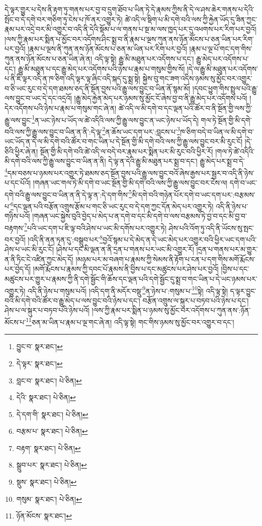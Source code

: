 དེ་ལྟར་གྱུར་པ་དེས་ནི་རྟག་ཏུ་གནས་པར་བྱ་བ་དྲུག་ཐོབ་པ་ཡིན་ཏེ་དེ་རྣམས་ཀྱིས་ནི་དེ་ལ་ཤས་ཆེར་གནས་པ་དེའི་སྤོང་བ་དེ་དགེ་བར་གཅིག་ཏུ་ངེས་པ་ཁོ་ནར་འགྱུར་ཏེ། ཚེ་འདི་ལ་སྡིག་པ་མི་དགེ་བའི་ལས་ཀྱི་རྐྱེན་ཡོད་དུ་ཟིན་ཀྱང་རྣམ་པར་འདྲེ་བར་མི་འགྱུར་བ་འདི་ནི་དེའི་སྡོམ་པ་ལ་གནས་པ་སྔ་མ་ལས་ཁྱད་པར་དུ་འཕགས་པར་རིག་པར་བྱའོ། །ལས་ཀྱི་རྣམ་པར་སྨིན་པ་མྱོང་བར་འདོགས་ཤིང་སྨྲ་བ་ནི་རྣམ་པ་ལྔས་ཀུན་ནས་ཉོན་མོངས་པ་ཅན་ཡིན་པར་རིག་པར་བྱའོ། །རྣམ་པ་ལྔས་ནི་ཀུན་ནས་ཉོན་མོངས་པ་ཅན་མ་ཡིན་པར་རིག་པར་བྱའོ། །རྣམ་པ་ལྔ་པོ་གང་དག་གིས་ཀུན་ནས་ཉོན་མོངས་པ་ཅན་ཡིན་ཞེ་ན། འདི་ལྟ་སྟེ། རྒྱུ་མི་མཐུན་པར་འདོགས་པ་དང་། རྒྱུ་མེད་པར་འདོགས་པ་དང་། རྒྱུ་མི་མཐུན་པ་དང་རྒྱུ་མེད་པར་འདོགས་པའི་ཉེས་པ་རྣམ་པ་གསུམ་གྱིས་སོ། །དེ་ལ་རྒྱུ་མི་མཐུན་པར་འདོགས་པ་ནི་ཇི་ལྟར་འདི་ན་ཁ་ཅིག་འདི་ལྟར་ལྟ་ཞིང་འདི་སྐད་དུ་སྨྲ་སྟེ། སྐྱེས་བུ་གང་ཟག་འདིས་ཉམས་སུ་མྱོང་བར་འགྱུར་བ་ཅི་ཡང་རུང་བ་དེ་དག་ཐམས་ཅད་ནི་སྔོན་བྱས་པའི་རྒྱུ་ལས་བྱུང་བ་ཡིན་ནོ་སྙམ་མོ། །དབང་ཕྱུག་གིས་སྤྲུལ་པའི་རྒྱུ་ལས་བྱུང་བ་ཡང་དེ་དང་འདྲའོ། །རྒྱུ་མེད་རྐྱེན་མེད་པར་ཉམས་སུ་མྱོང་ངོ་ཞེས་བྱ་བ་ནི་རྒྱུ་མེད་པར་འདོགས་པའོ། །དེར་འདོགས་པའི་ཉེས་པ་རྣམ་པ་གསུམ་གང་ཞེ་ན། ཚེ་འདི་ལ་མི་དགེ་བ་དང་ལྡན་པའི་ཚོར་བ་ནི་སྔོན་གྱི་ལས་ཀྱི་རྒྱུ་ལས་བྱུང་\footnote{བྱུང་བ་  སྣར་ཐང་། }ན་ཡང་ཉེས་པ་ཡོད་ལ་ཚེ་འདིའི་ལས་ཀྱི་རྒྱུ་ལས་བྱུང་ན་ཡང་ཉེས་པ་ཡོད་དེ། གལ་ཏེ་སྔོན་གྱི་མི་དགེ་བའི་ལས་ཀྱི་རྒྱུ་ལས་བྱུང་བ་ཡིན་ན་ནི་:དེ་ལྟ་\footnote{དེ་ལྟར་  སྣར་ཐང་། }ན་ཆོས་ཡང་དག་པར་:བླངས་པ་\footnote{བླང་བ་  སྣར་ཐང་།  པེ་ཅིན། }ཁ་ཅིག་བདེ་བ་ཡིན་ལ་མི་དགེ་བ་ཡང་ཡོད་ན་དེ་ལ་མི་དགེ་བའི་ཚོར་བ་གང་ཡིན་པ་དེ་སྔོན་གྱི་མི་དགེ་བའི་ལས་ཀྱི་རྒྱུ་ལས་བྱུང་བར་མི་རུང་ངོ། །དེ་ཅིའི་ཕྱིར་ཞེ་ན། སྔོན་གྱི་མི་དགེ་བའི་ཚེ་འདི་ལ་བདེ་བར་རྣམ་པར་སྨིན་པར་མི་རུང་བའི་ཕྱིར་རོ། །གལ་ཏེ་ཚེ་འདིའི་མི་དགེ་བའི་ལས་ཀྱི་རྒྱུ་ལས་བྱུང་བ་ཡིན་ན་ནི། དེ་ལྟ་ན་དེའི་རྒྱུ་མི་མཐུན་པར་སྨྲ་བ་དང་། རྒྱུ་མེད་པར་སྨྲ་བ་དེ་\footnote{དེའི་  སྣར་ཐང་།  པེ་ཅིན། }དམ་བཅས་པ་ཉམས་པར་འགྱུར་ཏེ་ཐམས་ཅད་སྔོན་བྱས་པའི་རྒྱུ་ལས་བྱུང་བའོ་ཞེས་རྒྱས་པར་སྦྱར་བ་འདི་ནི་ཉེས་པ་དང་པོའོ། །གཞན་ཡང་གལ་ཏེ་མི་དགེ་བ་ཡང་སྔོན་གྱི་མི་དགེ་བའི་ལས་ཀྱི་རྒྱུ་ལས་བྱུང་བར་ངེས་ལ། དགེ་བ་ཡང་དགེ་བའི་རྒྱུ་ལས་བྱུང་བ་ཡིན་ན་ནི་དེ་ལྟ་ན་:དེ་དག་གིས་\footnote{དེ་དག་གི་  སྣར་ཐང་།  པེ་ཅིན། }མི་དགེ་བའི་གཉེན་པོར་དགེ་བ་ཡང་དག་པར་:བརྩམས་པ་\footnote{བརྩམ་པ་  སྣར་ཐང་།  པེ་ཅིན། }དང་ལྡན་པའི་བརྩོན་འགྲུས་རྩོམ་པ་གང་ཅི་ཡང་རུང་བ་དེ་དག་ཀྱང་དོན་མེད་པར་འགྱུར་ཏེ། འདི་ནི་ཉེས་པ་གཉིས་པའོ། །གཞན་ཡང་སྐྱེས་བུའི་བྱེད་པ་མེད་པ་ན་དགེ་བ་དང་མི་དགེ་བ་ལས་བརྩམས་ཏེ་བྱ་བ་དང་མི་བྱ་བ་བརྟགས་\footnote{བརྟག་  སྣར་ཐང་།  པེ་ཅིན། }པའི་ཡང་དག་པ་ཇི་ལྟ་བའི་ཤེས་པ་ཡང་མི་དགོས་པར་འགྱུར་ཏེ། ཤེས་པའི་འོག་ཏུ་འདི་ནི་ཡོངས་སུ་སྤང་བར་བྱའོ། །འདི་ནི་ནན་ཏན་དུ་:བསྒྲུབ་པར་\footnote{སྒྲུབ་པར་  སྣར་ཐང་།  པེ་ཅིན། }བྱའོ་སྙམ་པ་དེ་མེད་ན་དེ་ཡང་མེད་པར་འགྱུར་བའི་ཕྱིར་ཡང་དག་པའི་ཤེས་པ་ཡང་མི་རུང་ངོ། །ཤེས་པ་དང་མི་ལྡན་ན་ནི་དྲན་པ་གནས་པར་ཡང་མི་འགྱུར་རོ། །དྲན་པ་གནས་པར་མ་གྱུར་ན་ནི་ཏིང་ངེ་འཛིན་ཀྱང་མེད་དོ། །མཉམ་པར་མ་བཞག་པ་རྣམས་ཀྱི་སེམས་ནི་རྟོག་པ་ངན་པ་དག་གིས་མགོ་རྨོངས་པར་བྱེད་དོ། །མགོ་རྨོངས་པ་རྣམས་ཀྱི་དབང་པོ་རྣམས་ནི་བྱིས་པ་དང་མཚུངས་པར་ཤེས་པར་བྱའོ། །བྱིས་པ་དང་མཚུངས་པར་གྱུར་པ་རྣམས་ཀྱི་ནི་དགེ་སྦྱོང་གི་ཆོས་དང་ལྡན་པའི་དགེ་སྦྱོང་དུ་སྨྲ་བ་གང་ཡིན་པ་དེ་ཡང་ཉམས་པར་འགྱུར་ཏེ། འདི་ནི་ཉེས་པ་གསུམ་པའོ། །འདི་དག་ནི་མདོར་བསྡུ་\footnote{སྡུས་  སྣར་ཐང་།  པེ་ཅིན། }ན་ཉེས་པ་:གསུམ་པ་\footnote{གསུམ་  སྣར་ཐང་།  པེ་ཅིན། }སྟེ། འདི་ལྟ་སྟེ། ད་ལྟར་བྱུང་བའི་མི་དགེ་བའི་ཚོར་བ་རྒྱུ་མེད་པ་ལས་བྱུང་བའི་ཉེས་པ་དང་། བརྩོན་འགྲུས་ལ་སྐུར་པ་བཏབ་པའི་ཉེས་པ་དང་། ཤེས་པ་ལ་སྐུར་པ་བཏབ་པའི་ཉེས་པའོ། །ལས་ཀྱི་རྣམ་པར་སྨིན་པ་ཉམས་སུ་མྱོང་བར་འདོགས་པ་ཀུན་ནས་:ཉོན་མོངས་པ་\footnote{ཉོན་མོངས་  སྣར་ཐང་། }ཅན་མ་ཡིན་པ་རྣམ་པ་ལྔ་གང་ཞེ་ན། འདི་ལྟ་སྟེ། གང་གིས་ཉམས་སུ་མྱོང་བར་འགྱུར་བ་དང་། 